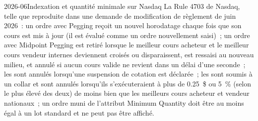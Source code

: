 \begin{dated}{2026-06}{Indexation et quantité minimale sur Nasdaq}\label{dat:mx:order-types-and-their-uses:nasdaq}
La Rule 4703 de Nasdaq, telle que reproduite dans une demande de modification de règlement de juin 2026~: un ordre avec Pegging reçoit un nouvel horodatage chaque fois que son cours est mis à jour (il est
évalué comme un ordre nouvellement saisi)~; un ordre avec Midpoint Pegging est retiré lorsque le meilleur cours acheteur et le meilleur cours vendeur internes deviennent croisés ou disparaissent, est ressaisi au
nouveau milieu, et annulé si aucun cours valide ne revient dans un délai d'une seconde~; les  sont annulés lorsqu'une suspension de cotation est déclarée~;
les  sont soumis à un collar et sont annulés lorsqu'ils s'exécuteraient à plus de 0.25~\$ ou 5~\% (selon le plus élevé des deux) de moins bien que les
meilleurs cours acheteur et vendeur nationaux~; un ordre muni de l'attribut Minimum Quantity doit être au moins égal à un lot standard et ne peut pas être affiché.
\end{dated}

